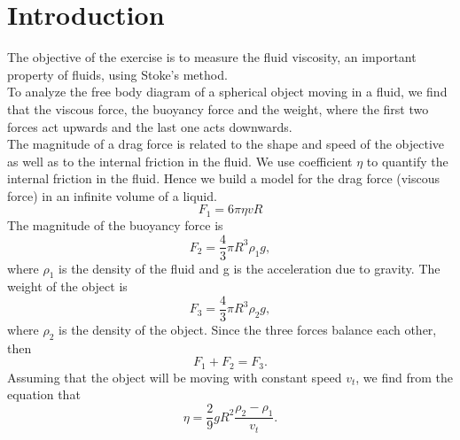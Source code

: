 \section{Introduction}
    The objective of the exercise is to measure the fluid viscosity, an important property of fluids, using Stoke's method.\\

    To analyze the free body diagram of a spherical object moving in a fluid, we find that the viscous force, the buoyancy force and the weight, where the first two forces act upwards and the last one  acts downwards.\\

    The magnitude of a drag force is related to the shape and speed of the objective as well as to the internal friction in the fluid. We use coefficient $\eta$ to quantify the internal friction in the fluid. Hence we build a model for the drag force (viscous force) in an infinite volume of a liquid.
    \[
        F_1=6\pi\eta vR
    \]
    The magnitude of the buoyancy force is
    \[
        F_2=\frac{4}{3}\pi R^3\rho_1g,
    \]
    where $\rho_1$ is the density of the fluid and g is the acceleration due to gravity. The weight of the object is
    \[
        F_3=\frac{4}{3}\pi R^3\rho_2g,    
    \]
    where $\rho_2$ is the density of the object. Since the three forces balance each other, then 
    \[
        F_1+F_2=F_3.
    \]
    Assuming that the object will be moving with constant speed $v_t$, we find from the equation that
    \[
        \eta=\frac{2}{9}gR^2\frac{\rho_2-\rho_1}{v_t}.
    \]
